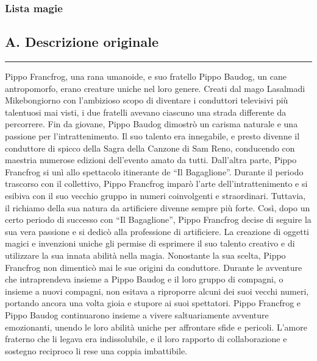 \subsubsection{Lista magie}\label{lista-magie}

\subsection{A. Descrizione originale}\label{a.-descrizione-originale}

\begin{center}\rule{0.5\linewidth}{0.5pt}\end{center}

Pippo Francfrog, una rana umanoide, e suo fratello Pippo Baudog, un cane
antropomorfo, erano creature uniche nel loro genere. Creati dal mago
Lasalmadi Mikebongiorno con l'ambizioso scopo di diventare i conduttori
televisivi più talentuosi mai visti, i due fratelli avevano ciascuno una
strada differente da percorrere. Fin da giovane, Pippo Baudog dimostrò
un carisma naturale e una passione per l'intrattenimento. Il suo talento
era innegabile, e presto divenne il conduttore di spicco della Sagra
della Canzone di Sam Reno, conducendo con maestria numerose edizioni
dell'evento amato da tutti. Dall'altra parte, Pippo Francfrog si unì
allo spettacolo itinerante de ``Il Bagaglione''. Durante il periodo
trascorso con il collettivo, Pippo Francfrog imparò l'arte
dell'intrattenimento e si esibiva con il suo vecchio gruppo in numeri
coinvolgenti e straordinari. Tuttavia, il richiamo della sua natura da
artificiere divenne sempre più forte. Così, dopo un certo periodo di
successo con ``Il Bagaglione'', Pippo Francfrog decise di seguire la sua
vera passione e si dedicò alla professione di artificiere. La creazione
di oggetti magici e invenzioni uniche gli permise di esprimere il suo
talento creativo e di utilizzare la sua innata abilità nella magia.
Nonostante la sua scelta, Pippo Francfrog non dimenticò mai le sue
origini da conduttore. Durante le avventure che intraprendeva insieme a
Pippo Baudog e il loro gruppo di compagni, o insieme a nuovi compagni,
non esitava a riproporre alcuni dei suoi vecchi numeri, portando ancora
una volta gioia e stupore ai suoi spettatori. Pippo Francfrog e Pippo
Baudog continuarono insieme a vivere saltuariamente avventure
emozionanti, unendo le loro abilità uniche per affrontare sfide e
pericoli. L'amore fraterno che li legava era indissolubile, e il loro
rapporto di collaborazione e sostegno reciproco li rese una coppia
imbattibile.
